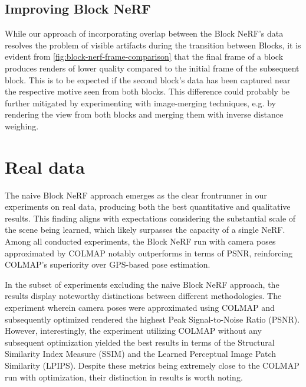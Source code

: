 \subsection{Improving Block NeRF}

While our approach of incorporating overlap between the Block NeRF's data resolves the problem of visible artifacts during the transition between Blocks, it is evident from \autoref{fig:block-nerf-frame-comparison} that the final frame of a block produces renders of lower quality compared to the initial frame of the subsequent block. This is to be expected if the second block's data has been captured near the respective motive seen from both blocks. This difference could probably be further mitigated by experimenting with image-merging techniques, e.g. by rendering the view from both blocks and merging them with inverse distance weighing.




\section{Real data}
The naive Block NeRF approach emerges as the clear frontrunner in our experiments on real data, producing both the best quantitative and qualitative results. This finding aligns with expectations considering the substantial scale of the scene being learned, which likely surpasses the capacity of a single NeRF. Among all conducted experiments, the Block NeRF run with camera poses approximated by COLMAP notably outperforms in terms of PSNR, reinforcing COLMAP's superiority over GPS-based pose estimation.

In the subset of experiments excluding the naive Block NeRF approach, the results display noteworthy distinctions between different methodologies. The experiment wherein camera poses were approximated using COLMAP and subsequently optimized rendered the highest Peak Signal-to-Noise Ratio (PSNR). However, interestingly, the experiment utilizing COLMAP without any subsequent optimization yielded the best results in terms of the Structural Similarity Index Measure (SSIM) and the Learned Perceptual Image Patch Similarity (LPIPS). Despite these metrics being extremely close to the COLMAP run with optimization, their distinction in results is worth noting.

